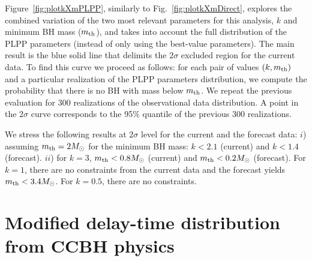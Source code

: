 \documentclass[fleqn,usenatbib,useAMS]{mnras}
\begin{document}
Figure~\ref{fig:plotkXmPLPP}, similarly to Fig.~\ref{fig:plotkXmDirect}, explores the combined variation of the two most relevant parameters for this analysis, $k$ and minimum BH mass ($m_{\rm th}$), and takes into account the full distribution of the PLPP parameters (instead of only using the best-value parameters).  The main result is the blue solid line that delimits the $2\sigma$ excluded region for the current data. To find this curve we proceed as follows: for each pair of values $(k, m_{\rm th})$ and a particular realization of the PLPP parameters distribution, we compute the probability that there is no BH with mass below $m_{\rm th}$. We repeat the previous evaluation for 300 realizations of the observational data distribution. A point in the $2\sigma$ curve corresponds to the 95\% quantile of the previous 300 realizations.

We stress the following results at $2\sigma$ level for the current and the forecast data: $i$) assuming $m_{\rm th} = 2 M_\odot$ for the minimum BH mass: $k < 2.1$ (current) and $k<1.4$ (forecast). $ii$) for $k = 3$, $m_{\rm th} < 0.8 M_\odot$ (current) and $m_{\rm th} < 0.2 M_\odot$ (forecast). For $k=1$, there are no constraints from the current data and the forecast yields $m_{\rm th} < 3.4 M_\odot$. For $k = 0.5$, there are no constraints.


\section{Modified delay-time distribution from CCBH physics}\label{sec:ghodla}
\end{document}
